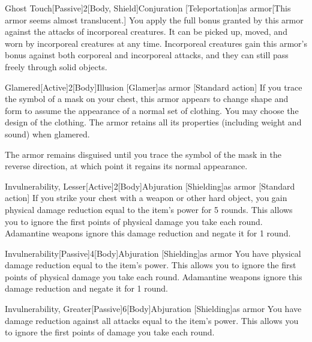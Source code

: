 \begin{magicitemdef}{Ghost Touch}[Passive]{2}[Body, Shield]{Conjuration [Teleportation]}{as armor}[This armor seems almost translucent.]
     You apply the full bonus granted by this armor against the attacks of incorporeal creatures.
    It can be picked up, moved, and worn by incorporeal creatures at any time.
    Incorporeal creatures gain this armor's bonus against both corporeal and incorporeal attacks, and they can still pass freely through solid objects.
\end{magicitemdef}

\begin{magicitemdef}{Glamered}[Active]{2}[Body]{Illusion [Glamer]}{as armor}
    [Standard action] If you trace the symbol of a mask on your chest, this armor appears to change shape and form to assume the appearance of a normal set of clothing.
    You may choose the design of the clothing.
    The armor retains all its properties (including weight and sound) when glamered.

    The armor remains disguised until you trace the symbol of the mask in the reverse direction, at which point it regains its normal appearance.
\end{magicitemdef}

\begin{magicitemdef}{Invulnerability, Lesser}[Active]{2}[Body]{Abjuration [Shielding]}{as armor}
    [Standard action] If you strike your chest with a weapon or other hard object, you gain physical damage reduction equal to the item's power for 5 rounds.
    This allows you to ignore the first points of physical damage you take each round.
    Adamantine weapons ignore this damage reduction and negate it for 1 round.
\end{magicitemdef}

\begin{magicitemdef}{Invulnerability}[Passive]{4}[Body]{Abjuration [Shielding]}{as armor}
     You have physical damage reduction equal to the item's power.
    This allows you to ignore the first points of physical damage you take each round.
    Adamantine weapons ignore this damage reduction and negate it for 1 round.
\end{magicitemdef}

\begin{magicitemdef}{Invulnerability, Greater}[Passive]{6}[Body]{Abjuration [Shielding]}{as armor}
     You have damage reduction against all attacks equal to the item's power.
    This allows you to ignore the first points of damage you take each round.
\end{magicitemdef}

